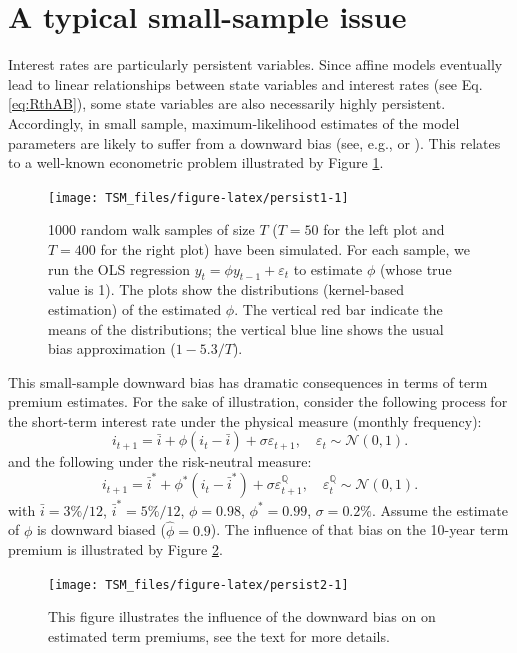 \documentclass[
  12pt,
]{book}
\theoremstyle{definition}
\theoremstyle{definition}
\theoremstyle{definition}
\theoremstyle{definition}
\theoremstyle{remark}
\begin{document}
\hypertarget{EstimationPersistency}{%
\section{A typical small-sample issue}\label{EstimationPersistency}}

Interest rates are particularly persistent variables. Since affine models eventually lead to linear relationships between state variables and interest rates (see Eq. \eqref{eq:RthAB}), some state variables are also necessarily highly persistent. Accordingly, in small sample, maximum-likelihood estimates of the model parameters are likely to suffer from a downward bias (see, e.g., \citet{Bauer_Rudebusch_Wu_2012} or \citet{Jardet_Monfort_Pegoraro_2013}). This relates to a well-known econometric problem illustrated by Figure \ref{fig:persist1}.

\begin{figure}
\texttt{[image: TSM\_files/figure-latex/persist1-1]} \caption{1000 random walk samples of size $T$ ($T=50$ for the left plot and $T=400$ for the right plot) have been simulated. For each sample, we run the OLS regression $y_t = \phi y_{t-1} + \varepsilon_t$ to estimate $\phi$ (whose true value is 1). The plots show the distributions (kernel-based estimation) of the estimated $\phi$. The vertical red bar indicate the means of the distributions; the vertical blue line shows the usual bias approximation ($1-5.3/T$).}\label{fig:persist1}
\end{figure}

This small-sample downward bias has dramatic consequences in terms of term premium estimates. For the sake of illustration, consider the following process for the short-term interest rate under the physical measure (monthly frequency):
\[
i_{t+1} = \bar{i} + \phi (i_{t}-\bar{i}) + \sigma \varepsilon_{t+1}, \quad \varepsilon_t \sim \mathcal{N}(0,1).
\]
and the following under the risk-neutral measure:
\[
i_{t+1} = \bar{i}^* + \phi^* (i_{t}-\bar{i}^*) + \sigma \varepsilon^{\mathbb{Q}}_{t+1}, \quad \varepsilon^{\mathbb{Q}}_t \sim \mathcal{N}(0,1).
\]
with \(\bar{i} = 3\%/12\), \(\bar{i}^* = 5\%/12\), \(\phi = 0.98\), \(\phi^*=0.99\), \(\sigma = 0.2\%\).
Assume the estimate of \(\phi\) is downward biased (\(\hat\phi=0.9\)). The influence of that bias on the 10-year term premium is illustrated by Figure \ref{fig:persist2}.

\begin{figure}
\texttt{[image: TSM\_files/figure-latex/persist2-1]} \caption{This figure illustrates the influence of the downward bias on on estimated term premiums, see the text for more details.}\label{fig:persist2}
\end{figure}
\end{document}
